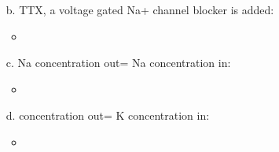 \documentclass[plain]{inVerba-notes}
\begin{document}
\begin{enumerate}
    \item[b.] TTX, a voltage gated Na+ channel blocker is added:
    
    \bigskip
    \bigskip
    
    \begin{itemize}
        \item 
    \end{itemize}

    \item[c.] Na concentration out= Na concentration in:
    
    \bigskip
    \bigskip
    
    \begin{itemize}
        \item 
    \end{itemize}

    \item[d.]  concentration out= K concentration in:

    \bigskip
    \bigskip
    
    \begin{itemize}
        \item 
    \end{itemize}
\end{enumerate}
\end{document}
